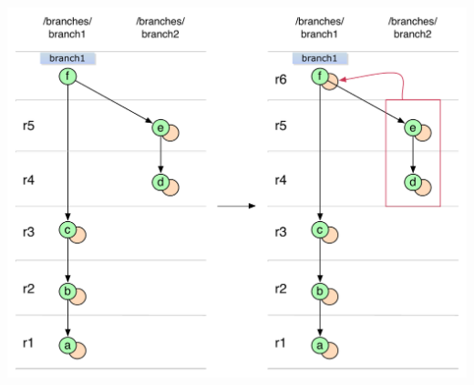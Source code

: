\begin{center}
\includegraphics[width=\textwidth]{img/diagrams/simple_merge_branch_no_parent_git_to_svn.pdf}%
\label{simple_merge_branch_no_parent_git_to_svn}%
\end{center}

